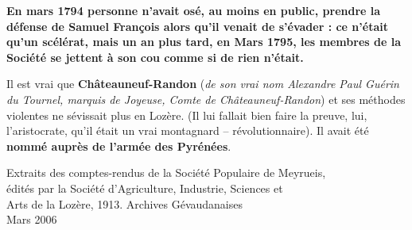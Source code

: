 \textbf{En mars 1794 personne n’avait osé, au moins en public, prendre la défense de Samuel
François alors qu’il venait de s’évader : ce n’était qu’un scélérat, mais un an plus tard,
en Mars 1795, les membres de la Société se jettent à son cou comme si de rien n’était.}

Il est vrai que \textbf{Châteauneuf-Randon} (\textit{de son vrai nom Alexandre Paul Guérin du
Tournel, marquis de Joyeuse, Comte de Châteauneuf-Randon}) et ses méthodes violentes
ne sévissait plus en Lozère. (Il lui fallait bien faire la preuve, lui, l’aristocrate, qu’il était un
vrai montagnard -- révolutionnaire). Il avait été \textbf{nommé auprès de l’armée des Pyrénées}.

\vfill

\begin{center}
\small
Extraits des comptes-rendus de la Société Populaire de Meyrueis,\\
édités par la Société d’Agriculture, Industrie, Sciences et\\
Arts de la Lozère, 1913. Archives Gévaudanaises\\
Mars 2006
\end{center}
